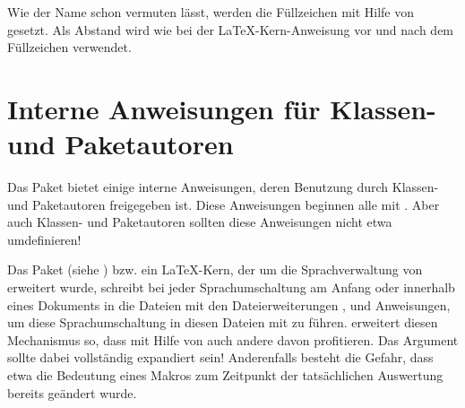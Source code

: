 Wie der Name schon vermuten lässt, werden die Füllzeichen mit Hilfe von
 gesetzt. Als Abstand wird wie bei der \LaTeX-Kern-Anweisung
 vor und nach dem Füllzeichen
 verwendet.%
\EndIndexGroup
%
\EndIndexGroup


\section{Interne Anweisungen für Klassen- und Paketautoren}

Das Paket  bietet einige interne Anweisungen, deren
Benutzung durch Klassen- und Paketautoren freigegeben ist. Diese Anweisungen
beginnen alle mit . Aber auch Klassen- und
Paketautoren sollten diese Anweisungen \iffalse nur verwenden und \fi nicht
etwa umdefinieren!\iffalse Ihre interne Funktion kann jederzeit geändert oder
erweitert werden, so dass jede Umdefinierung der Anweisungen die Funktion von
\Package{tocbasic} erheblich beschädigen könnte!\fi%


\begin{Declaration}
\end{Declaration}
Das Paket  (siehe \cite{package:babel})
bzw. ein \LaTeX-Kern, der um die Sprachverwaltung von 
erweitert wurde, schreibt bei jeder Sprachumschaltung am Anfang oder innerhalb
eines Dokuments in die Dateien mit den Dateierweiterungen ,
 und  Anweisungen, um diese Sprachumschaltung in diesen
Dateien mit zu führen.  erweitert diesen Mechanismus so,
dass mit Hilfe von  auch andere
 davon profitieren. Das Argument
 sollte dabei vollständig expandiert sein!
Anderenfalls besteht die Gefahr, dass etwa die Bedeutung eines Makros zum
Zeitpunkt der tatsächlichen Auswertung bereits geändert wurde.

